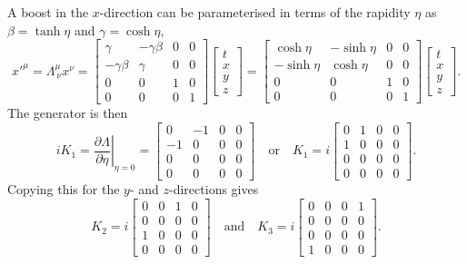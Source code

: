 \documentclass[notes.tex]{subfiles}
\begin{document}
\begin{Answer} 
A boost in the $x$-direction can be parameterised in terms of the rapidity $\eta$ as $\beta=\tanh\eta$ and $\gamma=\cosh \eta$,
\[ x'^\mu=\Lambda^\mu_{~\nu}x^\nu
=\left[\begin{matrix} \gamma & -\gamma\beta  & 0 &  0\\  -\gamma\beta & \gamma & 0 & 0 \\  0 & 0 & 1 & 0 \\ 0 & 0 & 0 & 1 \end{matrix}\right] \left[\begin{matrix}  t\\ x\\ y \\ z \end{matrix}\right]
=\left[\begin{matrix} \cosh\eta & -\sinh\eta  & 0 &  0\\  -\sinh\eta & \cosh \eta & 0 & 0 \\  0 & 0 & 1 & 0 \\ 0 & 0 & 0 & 1 \end{matrix}\right] \left[\begin{matrix}  t\\ x\\ y \\ z \end{matrix}\right]. \]
The generator is then
\[ iK_1 = \left. \frac{\partial \Lambda}{\partial \eta}\right|_{\eta=0} = 
\left[\begin{matrix} 0 & -1  & 0 &  0\\  -1 & 0 & 0 & 0 \\  0 & 0 & 0 & 0 \\ 0 & 0 & 0 & 0 \end{matrix}\right]\quad\text{or}\quad  K_1 = i \left[\begin{matrix} 0 & 1  & 0 &  0\\  1 & 0 & 0 & 0 \\  0 & 0 & 0 & 0 \\ 0 & 0 & 0 & 0 \end{matrix}\right].\]
Copying this for the $y$- and $z$-directions gives
\[ K_2 =  i\left[\begin{matrix} 0 & 0  & 1 &  0\\  0 & 0 & 0 & 0 \\  1 & 0 & 0 & 0 \\ 0 & 0 & 0 & 0 \end{matrix}\right] \quad\text{and}\quad
K_3 = i \left[\begin{matrix} 0 & 0  & 0 &  1\\  0 & 0 & 0 & 0 \\  0 & 0 & 0 & 0 \\ 1 & 0 & 0 & 0 \end{matrix}\right].  \]


\end{Answer}
\end{document}
